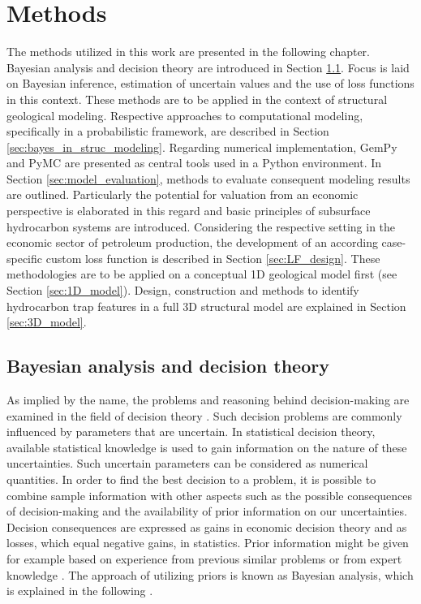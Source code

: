     \chapter{Methods}\label{cha:met}
    The methods utilized in this work are presented in the following chapter. Bayesian analysis and decision theory are introduced in Section \ref{sec:bayes}. Focus is laid on Bayesian inference, estimation of uncertain values and the use of loss functions in this context. 
    These methods are to be applied in the context of structural geological modeling. Respective approaches to computational modeling, specifically in a probabilistic framework, are described in Section \ref{sec:bayes_in_struc_modeling}. Regarding numerical implementation, GemPy and PyMC are presented as central tools used in a Python environment. In Section \ref{sec:model_evaluation}, methods to evaluate consequent modeling results are outlined. Particularly the potential for valuation from an economic perspective is elaborated in this regard and basic principles of subsurface hydrocarbon systems are introduced. Considering the respective setting in the economic sector of petroleum production, the development of an according case-specific custom loss function is described in Section \ref{sec:LF_design}. These methodologies are to be applied on a conceptual 1D geological model first (see Section \ref{sec:1D_model}). Design, construction and methods to identify hydrocarbon trap features in a full 3D structural model are explained in Section \ref{sec:3D_model}.
        
        \section{Bayesian analysis and decision theory}\label{sec:bayes}
	    As implied by the name, the problems and reasoning behind decision-making are examined in the field of decision theory \citep{berger2013stat}. Such decision problems are commonly influenced by parameters that are uncertain. In statistical decision theory, available statistical knowledge is used to gain information on the nature of these uncertainties. Such uncertain parameters can be considered as numerical quantities. In order to find the best decision to a problem, it is possible to combine sample information with other aspects such as the possible consequences of decision-making and the availability of prior information on our uncertainties. Decision consequences are expressed as gains in economic decision theory and as losses, which equal negative gains, in statistics. Prior information might be given for example based on experience from previous similar problems or from expert knowledge \citep{bratvold2010making}. The approach of utilizing priors is known as Bayesian analysis, which is explained in the following \citep{berger2013stat}. %
	    
